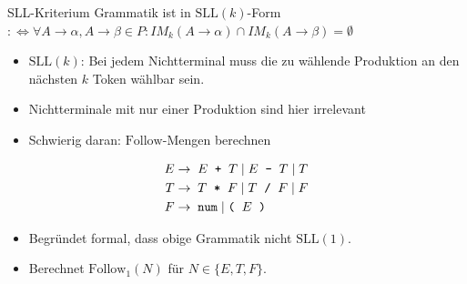 \documentclass{beamer}
\begin{document}
\begin{frame}{SLL-Kriterium}
	Grammatik ist in $\textrm{SLL}(k)$-Form\\
	$:\Leftrightarrow \forall A \to \alpha, A \to \beta \in P: IM_k(A \to \alpha) \cap IM_k(A \to \beta) = \emptyset$

	\begin{itemize}
		\item $\textrm{SLL}(k)$: Bei jedem Nichtterminal muss die zu wählende Produktion an den nächsten $k$ Token wählbar sein.
		\item Nichtterminale mit nur einer Produktion sind hier irrelevant
		\item Schwierig daran: $\textrm{Follow}$-Mengen berechnen
	\end{itemize}
	\pause
	\begin{align*}
		E \to & \;\; E \;\; \textrm{\texttt{+}} \;\; T \mid E \;\; \textrm{\texttt{-}} \;\; T \mid T\\
		T \to & \;\; T \;\; \textrm{\texttt{*}} \;\; F \mid T \;\; \textrm{\texttt{/}} \;\; F \mid F\\
		F \to & \;\; \textrm{\texttt{num}} \; | \; \textrm{\texttt{(}} \;\; E \;\; \textrm{\texttt{)}}
	\end{align*}
	
	\begin{itemize}
		\item Begründet formal, dass obige Grammatik nicht $\textrm{SLL}(1)$.
		\item Berechnet $\textrm{Follow}_1(N)$ für $N \in \{ E, T, F \}$.
	\end{itemize}
\end{frame}
\end{document}
